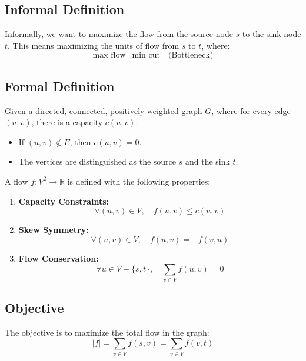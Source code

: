 \subsection{Informal Definition}
\begin{definition}
    Informally, we want to maximize the flow from the source node $s$ to the sink node $t$. This means maximizing the units of flow from $s$ to $t$, where:
    \[
    \text{max flow} = \text{min cut} \quad \text{(Bottleneck)}
    \]

\end{definition}

\subsection{Formal Definition}
\begin{definition}
    Given a directed, connected, positively weighted graph $G$, where for every edge $(u, v)$, there is a capacity $c(u, v)$:
    \begin{itemize}
        \item If $(u, v) \notin E$, then $c(u, v) = 0$.
        \item The vertices are distinguished as the source $s$ and the sink $t$.
    \end{itemize}

    A flow $f: V^2 \to \mathbb{R}$ is defined with the following properties:
    \begin{enumerate}
        \item \textbf{Capacity Constraints:} 
        \[
        \forall (u, v) \in V, \quad f(u, v) \leq c(u, v)
        \]
        \item \textbf{Skew Symmetry:}
        \[
        \forall (u, v) \in V, \quad f(u, v) = -f(v, u)
        \]
        \item \textbf{Flow Conservation:}
        \[
        \forall u \in V - \{s, t\}, \quad \sum_{v \in V} f(u, v) = 0
        \]
    \end{enumerate}
\end{definition}

\subsection{Objective}
\begin{definition}
    The objective is to maximize the total flow in the graph:
    \[
    |f| = \sum_{v \in V} f(s, v) = \sum_{v \in V} f(v, t)
    \]
\end{definition}

